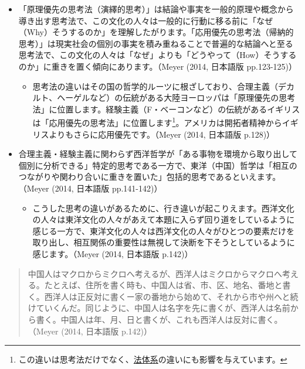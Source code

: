 \documentclass[
]{book}
\providecommand{\tightlist}{%
  \setlength{\itemsep}{0pt}\setlength{\parskip}{0pt}}
\begin{document}
\begin{itemize}
\item
  「原理優先の思考法（演繹的思考）」は結論や事実を一般的原理や概念から導き出す思考法で、この文化の人々は一般的に行動に移る前に「なぜ（Why）そうするのか」を理解したがります。「応用優先の思考法（帰納的思考）」は現実社会の個別の事実を積み重ねることで普遍的な結論へと至る思考法で、この文化の人々は「なぜ」よりも「どうやって（How）そうするのか」に重きを置く傾向にあります。（Meyer (2014, 日本語版 pp.123-125)）

  \begin{itemize}
  \tightlist
  \item
    思考法の違いはその国の哲学的ルーツに根ざしており、合理主義（デカルト、ヘーゲルなど）の伝統がある大陸ヨーロッパは「原理優先の思考法」に位置します。経験主義（F・ベーコンなど）の伝統があるイギリスは「応用優先の思考法」に位置します\footnote{この違いは思考法だけでなく、\protect\hyperlink{law}{法体系}の違いにも影響を与えています。}。アメリカは開拓者精神からイギリスよりもさらに応用優先です。（Meyer (2014, 日本語版 p.128)）
  \end{itemize}
\end{itemize}

\begin{itemize}
\item
  合理主義・経験主義に関わらず西洋哲学が「ある事物を環境から取り出して個別に分析できる」特定的思考である一方で、東洋（中国）哲学は「相互のつながりや関わり合いに重きを置いた」包括的思考であるといえます。（Meyer (2014, 日本語版 pp.141-142)）

  \begin{itemize}
  \tightlist
  \item
    こうした思考の違いがあるために、行き違いが起こりえます。西洋文化の人々は東洋文化の人々があえて本題に入らず回り道をしているように感じる一方で、東洋文化の人々は西洋文化の人々がひとつの要素だけを取り出し、相互関係の重要性は無視して決断を下そうとしているように感じます。（Meyer (2014, 日本語版 p.142)）
  \end{itemize}
\end{itemize}

\begin{quote}
中国人はマクロからミクロへ考えるが、西洋人はミクロからマクロへ考える。たとえば、住所を書く時も、中国人は省、市、区、地名、番地と書く。西洋人は正反対に書くー家の番地から始めて、それから市や州へと続けていくんだ。同じように、中国人は名字を先に書くが、西洋人は名前から書く。中国人は年、月、日と書くが、これも西洋人は反対に書く。（Meyer (2014, 日本語版 p.142)）
\end{quote}
\end{document}
